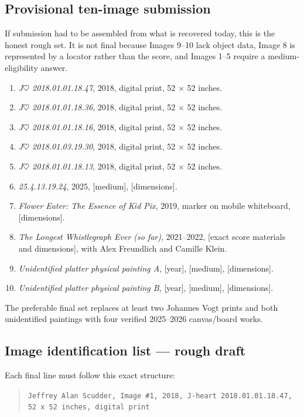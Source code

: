 \documentclass[11pt,letterpaper]{article}
\begin{document}
\subsection{Provisional ten-image submission}

If submission had to be assembled from what is recovered today, this is the honest rough set. It is not final because Images 9--10 lack object data, Image 8 is represented by a locator rather than the score, and Images 1--5 require a medium-eligibility answer.

\begin{enumerate}
\item \textit{J$\heartsuit$ 2018.01.01.18.47}, 2018, digital print, 52 $\times$ 52 inches.
\item \textit{J$\heartsuit$ 2018.01.01.18.36}, 2018, digital print, 52 $\times$ 52 inches.
\item \textit{J$\heartsuit$ 2018.01.01.18.16}, 2018, digital print, 52 $\times$ 52 inches.
\item \textit{J$\heartsuit$ 2018.01.03.19.30}, 2018, digital print, 52 $\times$ 52 inches.
\item \textit{J$\heartsuit$ 2018.01.01.18.13}, 2018, digital print, 52 $\times$ 52 inches.
\item \textit{25.4.13.19.24}, 2025, [medium], [dimensions].
\item \textit{Flower Eater: The Essence of Kid Pix}, 2019, marker on mobile whiteboard, [dimensions].
\item \textit{The Longest Whistlegraph Ever (so far)}, 2021--2022, [exact score materials and dimensions], with Alex Freundlich and Camille Klein.
\item \textit{Unidentified platter physical painting A}, [year], [medium], [dimensions].
\item \textit{Unidentified platter physical painting B}, [year], [medium], [dimensions].
\end{enumerate}

The preferable final set replaces at least two Johannes Vogt prints and both unidentified paintings with four verified 2025--2026 canvas/board works.

\subsection{Image identification list --- rough draft}

Each final line must follow this exact structure:

\begin{quote}
\texttt{Jeffrey Alan Scudder, Image \#1, 2018, J-heart 2018.01.01.18.47, 52 x 52 inches, digital print}
\end{quote}
\end{document}
